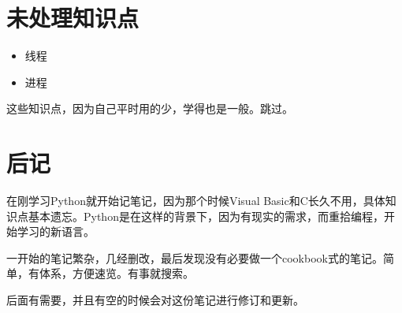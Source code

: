 \documentclass[12pt]{ctexart}
\providecommand{\tightlist}{%
      \setlength{\itemsep}{0pt}\setlength{\parskip}{0pt}}
\begin{document}
    \hypertarget{ux672aux5904ux7406ux77e5ux8bc6ux70b9}{%
\section{未处理知识点}\label{ux672aux5904ux7406ux77e5ux8bc6ux70b9}}

\begin{itemize}
\tightlist
\item
  线程
\item
  进程
\end{itemize}

这些知识点，因为自己平时用的少，学得也是一般。跳过。

    \hypertarget{ux540eux8bb0}{%
\section{后记}\label{ux540eux8bb0}}

在刚学习Python就开始记笔记，因为那个时候Visual
Basic和C长久不用，具体知识点基本遗忘。Python是在这样的背景下，因为有现实的需求，而重拾编程，开始学习的新语言。

一开始的笔记繁杂，几经删改，最后发现没有必要做一个cookbook式的笔记。简单，有体系，方便速览。有事就搜索。

后面有需要，并且有空的时候会对这份笔记进行修订和更新。


    
    
    
\end{document}
